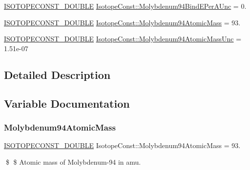 \begin{DoxyCompactItemize}
\mbox{\hyperlink{group___isotope_const-_macros_ga8f45a7272ce02c0b4c65c44636ed719a}{I\+S\+O\+T\+O\+P\+E\+C\+O\+N\+S\+T\+\_\+\+D\+O\+U\+B\+LE}} \mbox{\hyperlink{group___isotope_const-_molybdenum-_mo94_ga55f9083b17ff7846247918701ca303b6}{Isotope\+Const\+::\+Molybdenum94\+Bind\+E\+Per\+A\+Unc}} = 0.
\item 
\mbox{\hyperlink{group___isotope_const-_macros_ga8f45a7272ce02c0b4c65c44636ed719a}{I\+S\+O\+T\+O\+P\+E\+C\+O\+N\+S\+T\+\_\+\+D\+O\+U\+B\+LE}} \mbox{\hyperlink{group___isotope_const-_molybdenum-_mo94_ga728fa41ee6a3740261d795344284fb08}{Isotope\+Const\+::\+Molybdenum94\+Atomic\+Mass}} = 93.
\item 
\mbox{\hyperlink{group___isotope_const-_macros_ga8f45a7272ce02c0b4c65c44636ed719a}{I\+S\+O\+T\+O\+P\+E\+C\+O\+N\+S\+T\+\_\+\+D\+O\+U\+B\+LE}} \mbox{\hyperlink{group___isotope_const-_molybdenum-_mo94_gaab8f0853dd0d9d570ea651961e002b29}{Isotope\+Const\+::\+Molybdenum94\+Atomic\+Mass\+Unc}} = 1.\+51e-\/07
\end{DoxyCompactItemize}


\subsection{Detailed Description}


\subsection{Variable Documentation}
\mbox{\label{group___isotope_const-_molybdenum-_mo94_ga728fa41ee6a3740261d795344284fb08}} 
\subsubsection{\texorpdfstring{Molybdenum94\+Atomic\+Mass}{Molybdenum94AtomicMass}}
{\footnotesize\ttfamily \mbox{\hyperlink{group___isotope_const-_macros_ga8f45a7272ce02c0b4c65c44636ed719a}{I\+S\+O\+T\+O\+P\+E\+C\+O\+N\+S\+T\+\_\+\+D\+O\+U\+B\+LE}} Isotope\+Const\+::\+Molybdenum94\+Atomic\+Mass = 93.}

\$ \$ Atomic mass of Molybdenum-\/94 in amu. \mbox{\label{group___isotope_const-_molybdenum-_mo94_gaab8f0853dd0d9d570ea651961e002b29}} 

